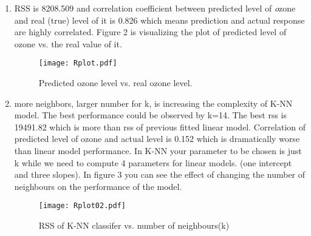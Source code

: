 \documentclass[12pt]{article}
\begin{document}
\begin{enumerate}
\item RSS is 8208.509 and correlation coefficient between predicted level of \emph ozone and real (true) level of it is 0.826 which means prediction and actual response are highly correlated. Figure 2 is visualizing the plot of predicted level of ozone vs. the real value of it.
\begin{figure}[!htb]
\centering
\texttt{[image: Rplot.pdf]}
\caption{Predicted ozone level vs. real ozone level.}
\label{fig:predicted ozone level vs. real ozone level}
\end{figure}

\item more neighbors, larger number for k, is increasing the complexity of  K-NN model. The best performance could be observed by k=14. The best rss is 19491.82 which is more than rss of previous fitted linear model. Correlation of predicted level of ozone and actual level is 0.152 which is dramatically worse than linear model performance. In K-NN your parameter to be chosen is just k while we need to compute 4 parameters for linear models. (one intercept and three slopes). In figure 3 you can see the effect of changing the number of neighbours on the performance of the model. 
\begin{figure}[!htb]
\centering
\texttt{[image: Rplot02.pdf]}
\caption{RSS of K-NN classifer vs. number of neighbours(k)}
\label{fig:RSS of K-NN classifer vs. number of neighbours(k)}
\end{figure}

\end{enumerate}
\end{document}
